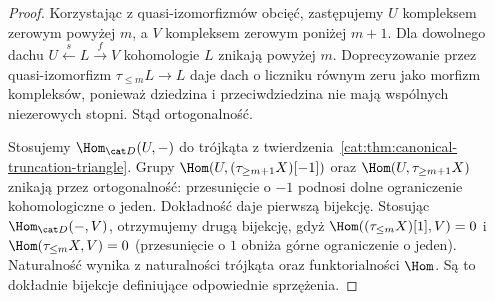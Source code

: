 \begin{proof}
Korzystając z quasi-izomorfizmów obcięć, zastępujemy $U$ kompleksem zerowym powyżej $m$, a $V$ kompleksem zerowym poniżej $m+1$. Dla dowolnego dachu $U\xleftarrow{s}L\xrightarrow{f}V$ kohomologie $L$ znikają powyżej $m$. Doprecyzowanie przez quasi-izomorfizm $\tau_{\le m}L\to L$ daje dach o liczniku równym zeru jako morfizm kompleksów, ponieważ dziedzina i przeciwdziedzina nie mają wspólnych niezerowych stopni. Stąd ortogonalność.

Stosujemy $\Hom_{\cat D}(U,-)$ do trójkąta z twierdzenia~\ref{cat:thm:canonical-truncation-triangle}. Grupy $\Hom(U,(\tau_{\ge m+1}X)[-1])$ oraz $\Hom(U,\tau_{\ge m+1}X)$ znikają przez ortogonalność: przesunięcie o $-1$ podnosi dolne ograniczenie kohomologiczne o jeden. Dokładność daje pierwszą bijekcję. Stosując $\Hom_{\cat D}(-,V)$, otrzymujemy drugą bijekcję, gdyż $\Hom((\tau_{\le m}X)[1],V)=0$ i $\Hom(\tau_{\le m}X,V)=0$ (przesunięcie o $1$ obniża górne ograniczenie o jeden). Naturalność wynika z naturalności trójkąta oraz funktorialności $\Hom$. Są to dokładnie bijekcje definiujące odpowiednie sprzężenia.
\end{proof}

